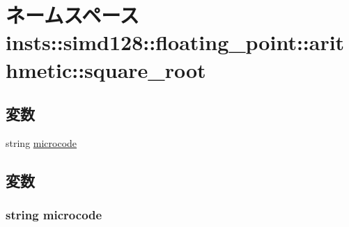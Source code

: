 \hypertarget{namespaceinsts_1_1simd128_1_1floating__point_1_1arithmetic_1_1square__root}{
\section{ネームスペース insts::simd128::floating\_\-point::arithmetic::square\_\-root}
\label{namespaceinsts_1_1simd128_1_1floating__point_1_1arithmetic_1_1square__root}
}
\subsection*{変数}
\begin{DoxyCompactItemize}
\item 
string \hyperlink{namespaceinsts_1_1simd128_1_1floating__point_1_1arithmetic_1_1square__root_a770f11a173e99389a8802f0107ed8f52}{microcode}
\end{DoxyCompactItemize}


\subsection{変数}
\hypertarget{namespaceinsts_1_1simd128_1_1floating__point_1_1arithmetic_1_1square__root_a770f11a173e99389a8802f0107ed8f52}{
\subsubsection[{microcode}]{\setlength{\rightskip}{0pt plus 5cm}string {\bf microcode}}}
\label{namespaceinsts_1_1simd128_1_1floating__point_1_1arithmetic_1_1square__root_a770f11a173e99389a8802f0107ed8f52}
